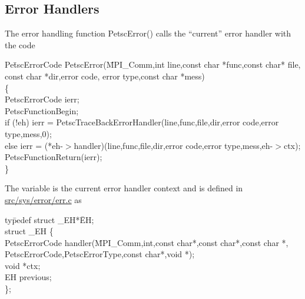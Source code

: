 \documentclass[twoside,12pt]{../sty/report_petsc}
\begin{document}
\subsection{Error Handlers}
The error handling function PetscError() calls the ``current'' error handler
with the code
\begin{tabbing}
Pe\=tscErrorCode PetscError(\=MPI\_Comm,int line,const char *func,const char* file,\\
 \> \> const char *dir,error code, error type,const char *mess)\\
\{ \\
  \> PetscErrorCode ierr;\\
  \>PetscFunctionBegin;\\
  \>if (!eh)     ierr = PetscTraceBackErrorHandler(line,func,file,dir,error code,error type,mess,0);\\
  \>else         ierr = (*eh-$>$handler)(line,func,file,dir,error code,error type,mess,eh-$>$ctx);\\
  \>PetscFunctionReturn(ierr);\\
\}
\end{tabbing}
The variable  is the current error handler context and is defined in
 \href{http://www.mcs.anl.gov/petsc/petsc-master/src/sys/error/err.c.html}{src/sys/error/err.c} as
\begin{tabbing}
ty\=pedef struct \_EH*\= EH;\\
struct \_EH \{\\
  \>PetscErrorCode \> handler(\=MPI\_Comm,int,const char*,const char*,const char *,\\
\> \> \> PetscErrorCode,PetscErrorType,const char*,void *);\\
  \>void \>  *ctx;\\
  \>EH   \>  previous;\\
\};
\end{tabbing}
\end{document}
